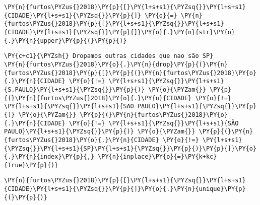     \begin{tcolorbox}[breakable, size=fbox, boxrule=1pt, pad at break*=1mm,colback=cellbackground, colframe=cellborder]
\begin{Verbatim}[commandchars=\\\{\}]
\PY{n}{furtos\PYZus{}2018}\PY{p}{[}\PY{l+s+s1}{\PYZsq{}}\PY{l+s+s1}{CIDADE}\PY{l+s+s1}{\PYZsq{}}\PY{p}{]} \PY{o}{=} \PY{n}{furtos\PYZus{}2018}\PY{p}{[}\PY{l+s+s1}{\PYZsq{}}\PY{l+s+s1}{CIDADE}\PY{l+s+s1}{\PYZsq{}}\PY{p}{]}\PY{o}{.}\PY{n}{str}\PY{o}{.}\PY{n}{upper}\PY{p}{(}\PY{p}{)}
\end{Verbatim}
\end{tcolorbox}

    \begin{tcolorbox}[breakable, size=fbox, boxrule=1pt, pad at break*=1mm,colback=cellbackground, colframe=cellborder]
\begin{Verbatim}[commandchars=\\\{\}]
\PY{c+c1}{\PYZsh{} Dropamos outras cidades que nao são SP}
\PY{n}{furtos\PYZus{}2018}\PY{o}{.}\PY{n}{drop}\PY{p}{(}\PY{n}{furtos\PYZus{}2018}\PY{p}{[}\PY{p}{(}\PY{n}{furtos\PYZus{}2018}\PY{o}{.}\PY{n}{CIDADE} \PY{o}{!=} \PY{l+s+s1}{\PYZsq{}}\PY{l+s+s1}{S.PAULO}\PY{l+s+s1}{\PYZsq{}}\PY{p}{)} \PY{o}{\PYZam{}} \PY{p}{(}\PY{n}{furtos\PYZus{}2018}\PY{o}{.}\PY{n}{CIDADE} \PY{o}{!=} \PY{l+s+s1}{\PYZsq{}}\PY{l+s+s1}{SAO PAULO}\PY{l+s+s1}{\PYZsq{}}\PY{p}{)} \PY{o}{\PYZam{}} \PY{p}{(}\PY{n}{furtos\PYZus{}2018}\PY{o}{.}\PY{n}{CIDADE} \PY{o}{!=} \PY{l+s+s1}{\PYZsq{}}\PY{l+s+s1}{SÃO PAULO}\PY{l+s+s1}{\PYZsq{}}\PY{p}{)} \PY{o}{\PYZam{}} \PY{p}{(}\PY{n}{furtos\PYZus{}2018}\PY{o}{.}\PY{n}{CIDADE} \PY{o}{!=} \PY{l+s+s1}{\PYZsq{}}\PY{l+s+s1}{SP}\PY{l+s+s1}{\PYZsq{}}\PY{p}{)}\PY{p}{]}\PY{o}{.}\PY{n}{index}\PY{p}{,} \PY{n}{inplace}\PY{o}{=}\PY{k+kc}{True}\PY{p}{)}
\end{Verbatim}
\end{tcolorbox}

    \begin{tcolorbox}[breakable, size=fbox, boxrule=1pt, pad at break*=1mm,colback=cellbackground, colframe=cellborder]
\begin{Verbatim}[commandchars=\\\{\}]
\PY{n}{furtos\PYZus{}2018}\PY{p}{[}\PY{l+s+s1}{\PYZsq{}}\PY{l+s+s1}{CIDADE}\PY{l+s+s1}{\PYZsq{}}\PY{p}{]}\PY{o}{.}\PY{n}{unique}\PY{p}{(}\PY{p}{)}
\end{Verbatim}
\end{tcolorbox}

